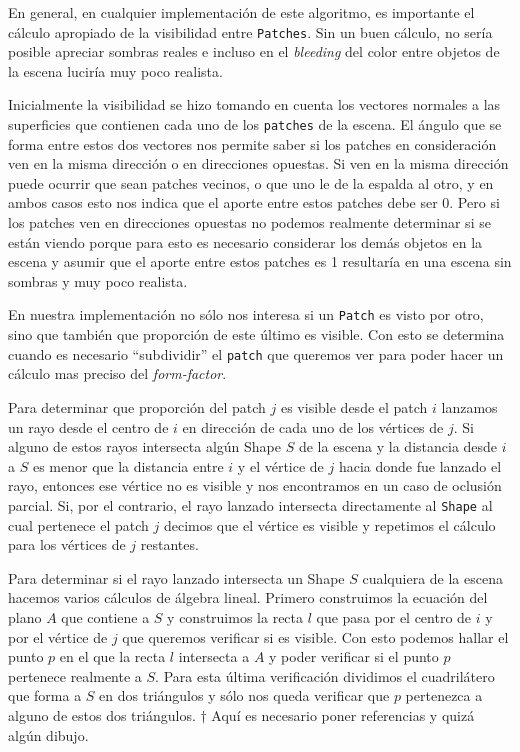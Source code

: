\documentclass[letterpaper]{article}
\begin{document}
En general, en cualquier implementación de este algoritmo, es
importante el cálculo apropiado de la visibilidad entre
\texttt{Patches}. Sin un buen cálculo, no sería posible apreciar
sombras reales e incluso en el \textsl{bleeding} del color entre
objetos de la escena luciría muy poco realista.

Inicialmente la visibilidad se hizo tomando en cuenta los vectores
normales a las superficies que contienen cada uno de los
\texttt{patches} de la escena. El ángulo que se forma entre estos dos
vectores nos permite saber si los patches en consideración ven en la
misma dirección o en direcciones opuestas. Si ven en la misma
dirección puede ocurrir que sean patches vecinos, o que uno le de la
espalda al otro, y en ambos casos esto nos indica que el aporte entre
estos patches debe ser 0. Pero si los patches ven en direcciones
opuestas no podemos realmente determinar si se están viendo porque
para esto es necesario considerar los demás objetos en la escena y
asumir que el aporte entre estos patches es 1 resultaría en una escena
sin sombras y muy poco realista.

En nuestra implementación no sólo nos interesa si un \texttt{Patch} es
visto por otro, sino que también que proporción de este último es
visible. Con esto se determina cuando es necesario ``subdividir'' el
\texttt{patch} que queremos ver para poder hacer un cálculo mas
preciso del \textsl{form-factor}.

Para determinar que proporción del patch $j$ es visible desde el patch
$i$ lanzamos un rayo desde el centro de $i$ en dirección de cada uno
de los vértices de $j$. Si alguno de estos rayos intersecta algún
Shape $S$ de la escena y la distancia desde $i$ a $S$ es menor que la
distancia entre $i$ y el vértice de $j$ hacia donde fue lanzado el
rayo, entonces ese vértice no es visible y nos encontramos en un caso
de oclusión parcial. Si, por el contrario, el rayo lanzado intersecta
directamente al \texttt{Shape} al cual pertenece el patch $j$ decimos
que el vértice es visible y repetimos el cálculo para los vértices de
$j$ restantes.

Para determinar si el rayo lanzado intersecta un Shape $S$ cualquiera
de la escena hacemos varios cálculos de álgebra lineal. Primero
construimos la ecuación del plano $A$ que contiene a $S$ y construimos
la recta $l$ que pasa por el centro de $i$ y por el vértice de $j$ que
queremos verificar si es visible. Con esto podemos hallar el punto $p$
en el que la recta $l$ intersecta a $A$ y poder verificar si el punto
$p$ pertenece realmente a $S$. Para esta última verificación dividimos
el cuadrilátero que forma a $S$ en dos triángulos y sólo nos queda
verificar que $p$ pertenezca a alguno de estos dos
triángulos. $\dagger$ Aquí es necesario poner referencias y quizá
algún dibujo.
\end{document}
